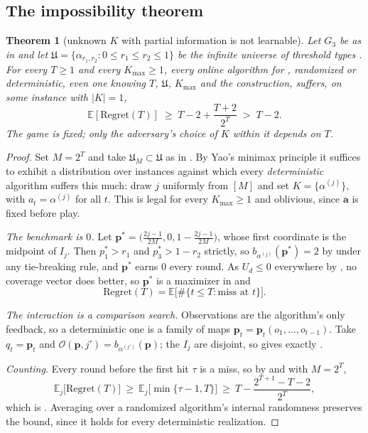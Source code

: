 \documentclass[letterpaper,9pt,twocolumn]{extarticle}
\newcommand{\pvec}{\mathbf{p}}
\newcommand{\avec}{\mathbf{a}}
\newcommand{\EE}{\mathbb{E}}
\newcommand{\Kmax}{K_{\max}}
\newcommand{\Univ}{\mathfrak{U}}
\newcommand{\Regret}{\mathrm{Regret}}
\theoremstyle{plain}
\newtheorem{theorem}{Theorem}
\theoremstyle{definition}
\theoremstyle{remark}
\begin{document}
\subsection{The impossibility theorem}
\label{sec:impossibility}

\begin{theorem}[unknown $K$ with partial information is not learnable]
\label{thm:impossible}
Let $G_3$ be as in  and let
$\Univ=\{\alpha_{r_1,r_2}:0\le r_1\le r_2\le 1\}$ be the infinite universe of
threshold types . For every $T\ge 1$ and every
$\Kmax\ge 1$, every online algorithm for , randomized
or deterministic, even one knowing $T$, $\Univ$, $\Kmax$ and the
construction, suffers, on some instance with $|K|=1$,
\begin{equation}
\EE[\Regret(T)]\;\ge\;T-2+\frac{T+2}{2^{T}}\;>\;T-2 .
\label{eq:impossible}
\end{equation}
The game is fixed; only the adversary's choice of $K$ within it depends on $T$.
\end{theorem}

\begin{proof}
Set $M=2^{T}$ and take $\Univ_M\subset\Univ$ as in . By
Yao's minimax principle it suffices to exhibit a distribution over instances
against which every \emph{deterministic} algorithm suffers this much: draw
$j$ uniformly from $[M]$ and set $K=\{\alpha^{(j)}\}$, with
$a_t=\alpha^{(j)}$ for all $t$. This is legal for every $\Kmax\ge1$ and
oblivious, since $\avec$ is fixed before play.

\emph{The benchmark is $0$.} Let
$\pvec^{*}=\bigl(\tfrac{2j-1}{2M},0,1-\tfrac{2j-1}{2M}\bigr)$, whose first
coordinate is the midpoint of $I_j$. Then $p^{*}_1>r_1$ and
$p^{*}_3>1-r_2$ strictly, so $b_{\alpha^{(j)}}(\pvec^{*})=2$ by
 under any tie-breaking rule, and $\pvec^{*}$ earns $0$ every
round. As $U_d\le 0$ everywhere by , no coverage vector
does better, so $\pvec^{*}$ is a maximizer in  and
\begin{equation}
\Regret(T)=\EE\bigl[\#\{t\le T:\text{miss at }t\}\bigr].
\label{eq:regret-is-misses}
\end{equation}

\emph{The interaction is a comparison search.} Observations are the algorithm's
only feedback, so a deterministic one is a family of maps
$\pvec_t=\pvec_t(o_1,\dots,o_{t-1})$. Take $q_t=\pvec_t$ and
$\mathcal{O}(\pvec,j')=b_{\alpha^{(j')}}(\pvec)$; the $I_j$ are disjoint, so
 gives exactly .

\emph{Counting.} Every round before the first hit $\tau$ is a miss, so by
 and  with $M=2^{T}$,
\[
\EE_j\bigl[\Regret(T)\bigr]\ \ge\ \EE_j\bigl[\min\{\tau-1,T\}\bigr]
\ \ge\ T-\frac{2^{T+1}-T-2}{2^{T}},
\]
which is . Averaging over a randomized algorithm's
internal randomness preserves the bound, since it holds for every
deterministic realization.
\end{proof}
\end{document}
